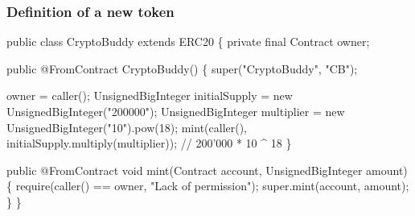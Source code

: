 \documentclass[11pt]{beamer}  %
\begin{document}
\begin{frame}[fragile]\frametitle{Definition of a new token}

{\scriptsize\begin{semiverbatim}
public class {\color{red}CryptoBuddy extends ERC20} \{
  private final Contract owner;

  public {\color{red}@FromContract} CryptoBuddy() \{
    super("CryptoBuddy", "CB");

    owner = caller();
    UnsignedBigInteger initialSupply = new UnsignedBigInteger("200000");
    UnsignedBigInteger multiplier = new UnsignedBigInteger("10").pow(18);
    mint(caller(), initialSupply.multiply(multiplier)); // 200'000 * 10 ^ 18
  \}

  public @FromContract void mint(Contract account, UnsignedBigInteger amount) \{
    require(caller() == owner, {\color{armygreen}"Lack of permission"});
    super.mint(account, amount);
  \}
\}
\end{semiverbatim}}

\end{frame}
\end{document}
